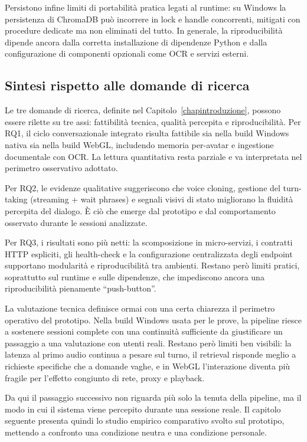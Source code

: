 Persistono infine limiti di portabilità pratica legati al runtime: su Windows la persistenza di ChromaDB può incorrere in lock e handle concorrenti, mitigati con procedure dedicate ma non eliminati del tutto. In generale, la riproducibilità dipende ancora dalla corretta installazione di dipendenze Python e dalla configurazione di componenti opzionali come OCR e servizi esterni.

\subsection{Sintesi rispetto alle domande di ricerca}
Le tre domande di ricerca, definite nel Capitolo~\ref{chapintroduzione}, possono essere rilette su tre assi: fattibilità tecnica, qualità percepita e riproducibilità. Per RQ1, il ciclo conversazionale integrato risulta fattibile sia nella build Windows nativa sia nella build WebGL, includendo memoria per-avatar e ingestione documentale con OCR. La lettura quantitativa resta parziale e va interpretata nel perimetro osservativo adottato.

Per RQ2, le evidenze qualitative suggeriscono che voice cloning, gestione del turn-taking (streaming + wait phrases) e segnali visivi di stato migliorano la fluidità percepita del dialogo. È ciò che emerge dal prototipo e dal comportamento osservato durante le sessioni analizzate.

Per RQ3, i risultati sono più netti: la scomposizione in micro-servizi, i contratti HTTP espliciti, gli health-check e la configurazione centralizzata degli endpoint supportano modularità e riproducibilità tra ambienti. Restano però limiti pratici, soprattutto sul runtime e sulle dipendenze, che impediscono ancora una riproducibilità pienamente ``push-button''.

La valutazione tecnica definisce ormai con una certa chiarezza il perimetro operativo del prototipo. Nella build Windows usata per le prove, la pipeline riesce a sostenere sessioni complete con una continuità sufficiente da giustificare un passaggio a una valutazione con utenti reali. Restano però limiti ben visibili: la latenza al primo audio continua a pesare sul turno, il retrieval risponde meglio a richieste specifiche che a domande vaghe, e in WebGL l'interazione diventa più fragile per l'effetto congiunto di rete, proxy e playback.

Da qui il passaggio successivo non riguarda più solo la tenuta della pipeline, ma il modo in cui il sistema viene percepito durante una sessione reale. Il capitolo seguente presenta quindi lo studio empirico comparativo svolto sul prototipo, mettendo a confronto una condizione neutra e una condizione personale.
\endgroup
